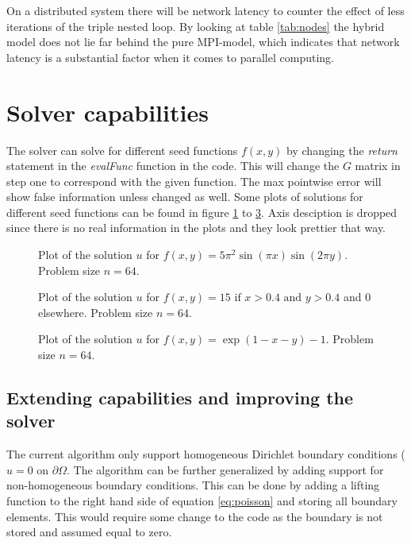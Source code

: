 \documentclass[11pt,a4paper,english]{article}
\numberwithin{figure}{subsection}
\numberwithin{table}{subsection}
\begin{document}
On a distributed system there will be network latency to counter the effect of less iterations of the triple nested loop. By looking at table \ref{tab:nodes} the hybrid model does not lie far behind the pure MPI-model, which indicates that network latency is a substantial factor when it comes to parallel computing.

\newpage
\section{Solver capabilities}
The solver can solve for different seed functions $f(x,y)$ by changing the \textit{return} statement in the \textit{evalFunc} function in the code. This will change the $G$ matrix in step one to correspond with the given function. The max pointwise error will show false information unless changed as well. Some plots of solutions for different seed functions can be found in figure \ref{fig:sol1} to \ref{fig:sol4}. Axis desciption is dropped since there is no real information in the plots and they look prettier that way.
	
\begin{figure}[h]
	\centering
	
	\caption{Plot of the solution $u$ for $f(x,y) = 5\pi^2\sin(\pi x)\sin(2\pi y)$. Problem size $n=64$.}
	\label{fig:sol1}
\end{figure}

\begin{figure}[bp]
	\centering
	
	\caption{Plot of the solution $u$ for $f(x,y) = 15 \text{ if } x > 0.4 \text{ and } y > 0.4$ and 0 elsewhere. Problem size $n=64$.}
	\label{fig:sol2}
\end{figure}

%	

\begin{figure}[p]
	\centering
	
	\caption{Plot of the solution $u$ for $f(x,y) = \exp(1-x-y)-1$. Problem size $n=64$.}
	\label{fig:sol4}
\end{figure}


\subsection{Extending capabilities and improving the solver}
The current algorithm only support homogeneous Dirichlet boundary conditions ($u = 0 \text{ on } \partial\Omega$. The algorithm can be further generalized by adding support for non-homogeneous boundary conditions. This can be done by adding a lifting function to the right hand side of equation \eqref{eq:poisson} and storing all boundary elements. This would require some change to the code as the boundary is not stored and assumed equal to zero.
\end{document}
